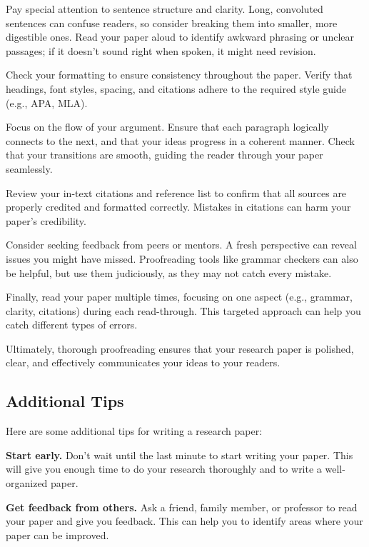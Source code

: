 \documentclass[
  b5paper]{book}
\begin{document}
Pay special attention to sentence structure and clarity. Long, convoluted sentences can confuse readers, so consider breaking them into smaller, more digestible ones. Read your paper aloud to identify awkward phrasing or unclear passages; if it doesn't sound right when spoken, it might need revision.

Check your formatting to ensure consistency throughout the paper. Verify that headings, font styles, spacing, and citations adhere to the required style guide (e.g., APA, MLA).

Focus on the flow of your argument. Ensure that each paragraph logically connects to the next, and that your ideas progress in a coherent manner. Check that your transitions are smooth, guiding the reader through your paper seamlessly.

Review your in-text citations and reference list to confirm that all sources are properly credited and formatted correctly. Mistakes in citations can harm your paper's credibility.

Consider seeking feedback from peers or mentors. A fresh perspective can reveal issues you might have missed. Proofreading tools like grammar checkers can also be helpful, but use them judiciously, as they may not catch every mistake.

Finally, read your paper multiple times, focusing on one aspect (e.g., grammar, clarity, citations) during each read-through. This targeted approach can help you catch different types of errors.

Ultimately, thorough proofreading ensures that your research paper is polished, clear, and effectively communicates your ideas to your readers.

\hypertarget{additional-tips}{%
\subsection*{Additional Tips}\label{additional-tips}}

Here are some additional tips for writing a research paper:

\textbf{Start early.} Don't wait until the last minute to start writing your paper. This will give you enough time to do your research thoroughly and to write a well-organized paper.

\textbf{Get feedback from others.} Ask a friend, family member, or professor to read your paper and give you feedback. This can help you to identify areas where your paper can be improved.
\end{document}
